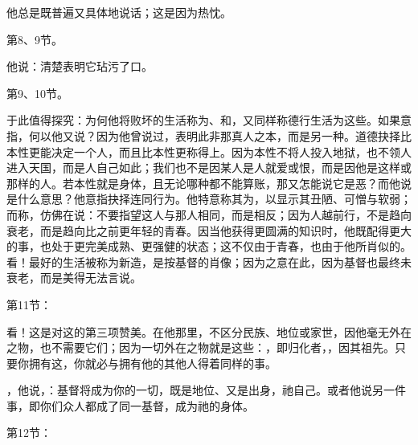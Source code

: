 他总是既普遍又具体地说话；这是因为热忱。\par

第8、9节。\par

他说：清楚表明它玷污了口。\par

第9、10节。\par

于此值得探究：为何他将败坏的生活称为、和，又同样称德行生活为这些。如果意指，何以他又说？因为他曾说过，表明此非那真人之本，而是另一种。道德抉择比本性更能决定一个人，而且比本性更称得上。因为本性不将人投入地狱，也不领人进入天国，而是人自己如此；我们也不是因某人是人就爱或恨，而是因他是这样或那样的人。若本性就是身体，且无论哪种都不能算账，那又怎能说它是恶？而他说是什么意思？他意指抉择连同行为。他特意称其为，以显示其丑陋、可憎与软弱；而称，仿佛在说：不要指望这人与那人相同，而是相反；因为人越前行，不是趋向衰老，而是趋向比之前更年轻的青春。因当他获得更圆满的知识时，他既配得更大的事，也处于更完美成熟、更强健的状态；这不仅由于青春，也由于他所肖似的。看！最好的生活被称为新造，是按基督的肖像；因为之意在此，因为基督也最终未衰老，而是美得无法言说。\par

第11节：\par

看！这是对这的第三项赞美。在他那里，不区分民族、地位或家世，因他毫无外在之物，也不需要它们；因为一切外在之物就是这些：，即归化者，，因其祖先。只要你拥有这，你就必与拥有他的其他人得着同样的事。\par

，他说，：基督将成为你的一切，既是地位、又是出身，祂自己。或者他说另一件事，即你们众人都成了同一基督，成为祂的身体。\par

第12节：\par

